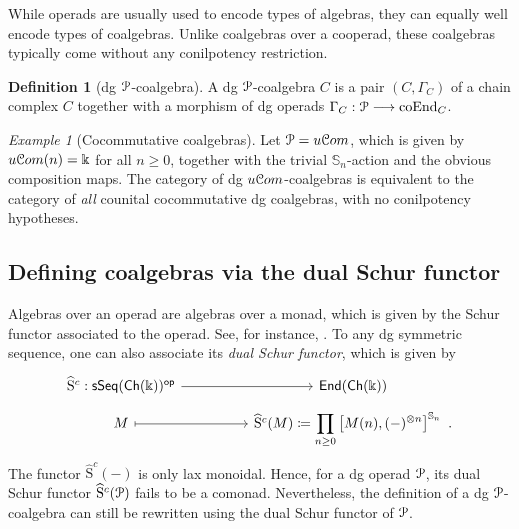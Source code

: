 \documentclass{proc-l}
\renewcommand{\mathcal}{\EuScript}
\newcommand{\baseonecat}{\mathsf{Ch}(\kk)}
\newcommand{\oneop}{\mathcal{P}}
\theoremstyle{plain}
\theoremstyle{definition}
\newtheorem{definition}[{theorem}]{Definition}
\theoremstyle{remark}
\newtheorem{example}[{theorem}]{Example}
\newcommand{\kk}{\Bbbk}
\begin{document}
While operads are usually used to encode types of algebras, they can equally well encode types of coalgebras. Unlike coalgebras over a cooperad, these coalgebras typically come without any conilpotency restriction.

\begin{definition}[{dg $\oneop$-coalgebra}]%
\label{Definition:2.6}
A dg $\oneop$-coalgebra $C$ is a pair $(C,\Gamma_C)$ of a chain complex $C$ together with a morphism of dg operads $\Gamma_C: \oneop \longrightarrow \mathrm{coEnd}_C$.
\end{definition}

\begin{example}[{Cocommutative coalgebras}]%
\label{Example:2.7}
Let $\mathcal{P} = u\mathcal{C}om$, which is given by $u\mathcal{C}om(n) = \kk$ for all $n \geq 0$, together with the trivial $\mathbb{S}_n$-action and the obvious composition maps. The category of dg $u\mathcal{C}om$-coalgebras is equivalent to the category of \textit{all} counital cocommutative dg coalgebras, with no conilpotency hypotheses.
\end{example}

\subsection{Defining coalgebras via the dual Schur functor}%
\label{Section:2.2}\label{set:1-dual schur}
Algebras over an operad are algebras over a monad, which is given by the Schur functor associated to the operad. See, for instance, \cite[Chapter 2]{Fresse09}. To any dg symmetric sequence, one can also associate its \textit{dual Schur functor}, which is given by
\[
\begin{tikzcd}[column sep=4pc,row sep=0.5pc]
\widehat{\mathrm{S}}^c : \mathsf{sSeq}(\mathsf{Ch}(\kk))^{\mathsf{op}} \arrow[r]
&\mathsf{End}(\baseonecat) \\
M \arrow[r,mapsto]
&\widehat{\mathrm{S}}^c(M) \coloneqq \displaystyle \prod_{n \geq 0} \left[M(n),(-)^{\otimes n}\right]^{\mathbb{S}_n}~.
\end{tikzcd}
\]
The functor $\widehat{\mathrm{S}}^c(-)$ is only lax monoidal. Hence, for a dg operad $\oneop$, its dual Schur functor $\widehat{\mathrm{S}}^c(\oneop)$ fails to be a comonad. Nevertheless, the definition of a dg $\oneop$-coalgebra can still be rewritten using the dual Schur functor of $\oneop$.
\end{document}
